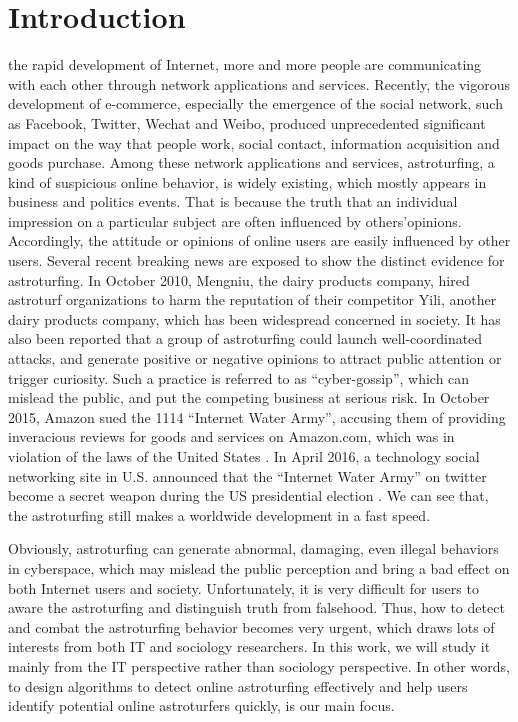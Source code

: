 \documentclass[lettersize,journal]{IEEEtran}
\begin{document}
\section{Introduction}
 the rapid development of Internet, more and more people are communicating with each other through network applications and services. Recently, the vigorous development of e-commerce, especially the emergence of the social network, such as Facebook, Twitter, Wechat and Weibo, produced unprecedented significant impact on the way that people work, social contact, information acquisition and goods purchase. Among these network applications and services, astroturfing, a kind of suspicious online behavior, is widely existing, which mostly appears in business and politics events. That is because the truth that an individual impression on a particular subject are often influenced by others\textquoteright  opinions\cite{Kelman1958Compliance}. Accordingly, the attitude or opinions of online users are easily influenced by other users.
Several recent breaking news are exposed to show the distinct evidence for astroturfing. In October 2010, Mengniu, the dairy products company, hired astroturf organizations to harm the reputation of their competitor Yili, another dairy products company, which has been widespread concerned in society. It has also been reported that a group of astroturfing could launch well-coordinated attacks, and generate positive or negative opinions to attract public attention or trigger curiosity. Such a practice is referred to as ``cyber-gossip'', which can mislead the public, and put the competing business at serious risk.
In October 2015, Amazon sued the 1114 ``Internet Water Army'', accusing them of providing inveracious reviews for goods and services on Amazon.com, which was in violation of the laws of the United States \cite{45953838_0-web}.
In April 2016, a technology social networking site in U.S. announced that the ``Internet Water Army'' on twitter become a secret weapon during the US presidential election \cite{doc-ifxrcizu4121450-web}.
We can see that, the astroturfing still makes a worldwide development in a fast speed.

Obviously, astroturfing can generate abnormal, damaging, even illegal behaviors in cyberspace, which may mislead the public perception and bring a bad effect on both Internet users and society. Unfortunately, it is very difficult for users to aware the astroturfing and distinguish truth from falsehood. Thus, how to detect and combat the astroturfing
behavior becomes very urgent, which draws lots of interests from both IT and sociology researchers.
In this work, we will study it mainly from the IT perspective rather than sociology perspective. In other words, to design algorithms to detect online astroturfing effectively and help users identify potential online astroturfers quickly, is our main focus.
\end{document}

